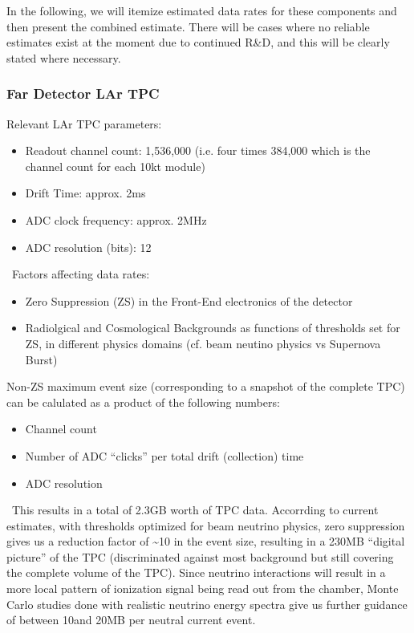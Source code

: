 In the following, we will itemize estimated data rates for these components and then present the combined estimate.
There will be cases where no reliable estimates exist at the moment due to continued R\&D, and this will be clearly stated where necessary.

\subsubsection{Far Detector LAr TPC}
Relevant  LAr TPC parameters:
\begin{itemize}
\item Readout channel count: 1,536,000 (i.e. four times 384,000 which is the channel count for each 10kt module)
\item Drift Time: approx. 2ms
\item ADC clock frequency: approx. 2MHz
\item ADC resolution (bits): 12
\end{itemize}
\
Factors affecting data rates:
\begin{itemize}
\item Zero Suppression (ZS)  in the Front-End electronics of the detector
\item Radiolgical and Cosmological Backgrounds as functions of thresholds set for ZS, in different physics domains (cf. beam neutino physics vs Supernova Burst)
\end{itemize}

Non-ZS maximum event size (corresponding to a snapshot of the complete TPC) can be calulated as a product of the following numbers:
\begin{itemize}
\item Channel count
\item Number of ADC ``clicks'' per total drift (collection) time
\item ADC resolution
\end{itemize}
\
This results in a total of 2.3GB worth of TPC data. Accorrding to current estimates, with thresholds optimized for beam neutrino physics, zero suppression
gives us a reduction factor of \textasciitilde 10 in the event size, resulting in a 230MB ``digital picture'' of the TPC (discriminated against most background
but still covering the complete volume of the TPC). Since neutrino interactions will result in a more local pattern of ionization signal being read out
from the chamber, Monte Carlo studies done with realistic neutrino energy spectra give us further guidance of between 10and 20MB per neutral current event.


